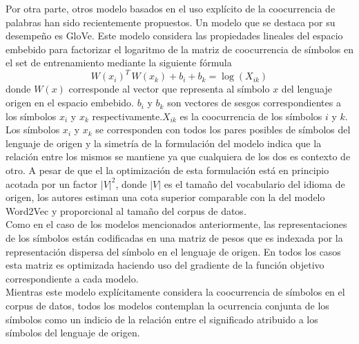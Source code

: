 \documentclass{article}
\begin{document}
	Por otra parte, otros modelo basados en el uso explícito de la coocurrencia de palabras han sido recientemente propuestos\cite{39GlovePennington}. Un modelo que se destaca por su desempeño es GloVe. Este modelo considera las propiedades lineales del espacio embebido para factorizar el logaritmo de la matriz de coocurrencia de símbolos en el set de entrenamiento mediante la siguiente fórmula
	\begin{equation*}
	W(x_i)^T \, W(x_k) + b_i + b_k = \log(X_{ik})
	\end{equation*}
	donde $W(x)$ corresponde al vector que representa al símbolo $x$ del lenguaje origen en el espacio embebido. $b_i$ y $b_k$ son vectores de sesgos correspondientes a los símbolos $x_i$ y $x_k$ respectivamente.$X_{ik}$ es la coocurrencia de los símbolos $i$ y $k$. Los símbolos $x_i$ y $x_k$ se corresponden con todos los pares posibles de símbolos del lenguaje de origen y la simetría de la formulación del modelo indica que la relación entre los mismos se mantiene ya que cualquiera de los dos es contexto de otro. A pesar de que el la optimización de esta formulación está en principio acotada por un factor $|V|^2$, donde $|V|$ es el tamaño del vocabulario del idioma de origen, los autores estiman una cota superior comparable con la del modelo Word2Vec y proporcional al tamaño del corpus de datos.\\
	Como en el caso de los modelos mencionados anteriormente, las representaciones de los símbolos están codificadas en una matriz de pesos que es indexada por la representación dispersa del símbolo en el lenguaje de origen. En todos los casos esta matriz es optimizada haciendo uso del gradiente de la función objetivo correspondiente a cada modelo.\\
	Mientras este modelo explícitamente considera la coocurrencia de símbolos en el corpus de datos, todos los modelos contemplan la ocurrencia conjunta de los símbolos como un indicio de la relación entre el significado atribuido a los símbolos del lenguaje de origen.\\
	
\end{document}
